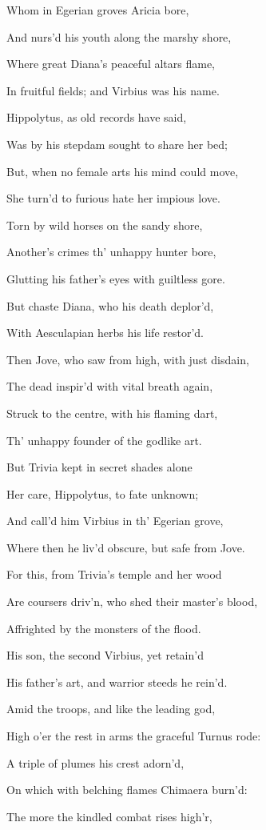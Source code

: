 Whom in Egerian groves Aricia bore,

And nurs’d his youth along the marshy shore,

Where great Diana’s peaceful altars flame,

In fruitful fields; and Virbius was his name.

Hippolytus, as old records have said,

Was by his stepdam sought to share her bed;

But, when no female arts his mind could move,

She turn’d to furious hate her impious love.

Torn by wild horses on the sandy shore,

Another’s crimes th’ unhappy hunter bore,

Glutting his father’s eyes with guiltless gore.

But chaste Diana, who his death deplor’d,

With Aesculapian herbs his life restor’d.

Then Jove, who saw from high, with just disdain,

The dead inspir’d with vital breath again,

Struck to the centre, with his flaming dart,

Th’ unhappy founder of the godlike art.

But Trivia kept in secret shades alone

Her care, Hippolytus, to fate unknown;

And call’d him Virbius in th’ Egerian grove,

Where then he liv’d obscure, but safe from Jove.

For this, from Trivia’s temple and her wood

Are coursers driv’n, who shed their master’s blood,

Affrighted by the monsters of the flood.

His son, the second Virbius, yet retain’d

His father’s art, and warrior steeds he rein’d.

Amid the troops, and like the leading god,

High o’er the rest in arms the graceful Turnus rode:

A triple of plumes his crest adorn’d,

On which with belching flames Chimaera burn’d:

The more the kindled combat rises high’r,

